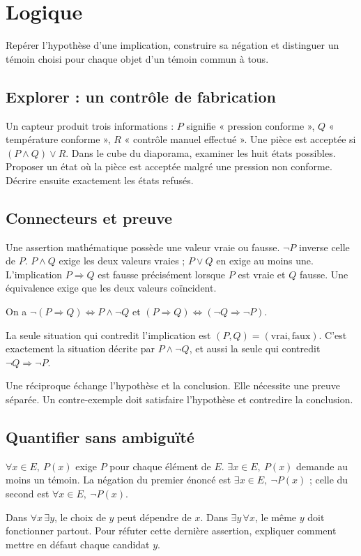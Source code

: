 \clearpage
\section{Logique}
\begin{objectif}
Repérer l'hypothèse d'une implication, construire sa négation et distinguer un témoin choisi pour chaque objet d'un témoin commun à tous.
\end{objectif}
\subsection{Explorer : un contrôle de fabrication}
Un capteur produit trois informations : $P$ signifie « pression conforme », $Q$ « température conforme », $R$ « contrôle manuel effectué ». Une pièce est acceptée si $(P\wedge Q)\vee R$. Dans le cube du diaporama, examiner les huit états possibles. Proposer un état où la pièce est acceptée malgré une pression non conforme. Décrire ensuite exactement les états refusés.
\subsection{Connecteurs et preuve}
\begin{definition}
Une assertion mathématique possède une valeur vraie ou fausse. $\neg P$ inverse celle de $P$. $P\wedge Q$ exige les deux valeurs vraies ; $P\vee Q$ en exige au moins une. L'implication $P\Rightarrow Q$ est fausse précisément lorsque $P$ est vraie et $Q$ fausse. Une équivalence exige que les deux valeurs coïncident.
\end{definition}
\begin{propriete}
On a $\neg(P\Rightarrow Q)\iff P\wedge\neg Q$ et $(P\Rightarrow Q)\iff(\neg Q\Rightarrow\neg P)$.
\end{propriete}
\begin{demonstration}
La seule situation qui contredit l'implication est $(P,Q)=(\text{vrai},\text{faux})$. C'est exactement la situation décrite par $P\wedge\neg Q$, et aussi la seule qui contredit $\neg Q\Rightarrow\neg P$.
\end{demonstration}
Une réciproque échange l'hypothèse et la conclusion. Elle nécessite une preuve séparée. Un contre-exemple doit satisfaire l'hypothèse et contredire la conclusion.
\subsection{Quantifier sans ambiguïté}
\begin{definition}[témoins]
$\forall x\in E,\ P(x)$ exige $P$ pour chaque élément de $E$. $\exists x\in E,\ P(x)$ demande au moins un témoin. La négation du premier énoncé est $\exists x\in E,\ \neg P(x)$ ; celle du second est $\forall x\in E,\ \neg P(x)$.
\end{definition}
Dans $\forall x\,\exists y$, le choix de $y$ peut dépendre de $x$. Dans $\exists y\,\forall x$, le même $y$ doit fonctionner partout. Pour réfuter cette dernière assertion, expliquer comment mettre en défaut chaque candidat $y$.
